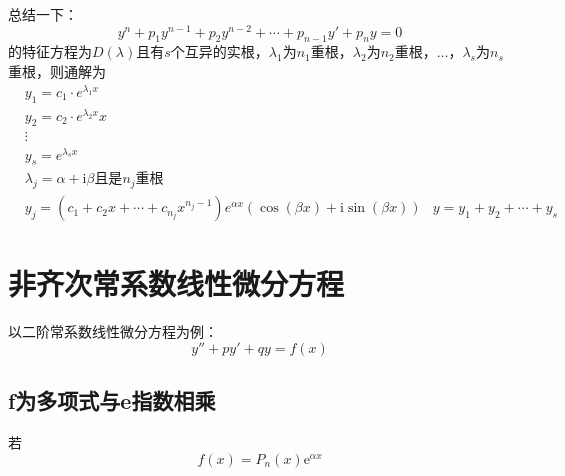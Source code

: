 \documentclass[math]{amznotes}
\begin{document}
总结一下：
\begin{equation*}
	y^n + p_1 y^{n-1} + p_2 y^{n-2} + \cdots + p_{n-1} y' + p_n y = 0
\end{equation*}
的特征方程为$D(\lambda)$且有$s$个互异的实根，$\lambda_1$为$n_1$重根，$\lambda_2$为$n_2$重根，$\ldots$，$\lambda_s$为$n_s$重根，则通解为
\begin{equation*}
	\begin{aligned}
		 & y_1 = c_1 \cdot e^{\lambda_1 x}                                                                           \\
		 & y_2 = c_2 \cdot e^{\lambda_2 x}x                                                                          \\
		 & \vdots                                                                                                    \\
		 & y_{s} = e^{\lambda_s x}                                                                                   \\
		 & \lambda_j = \alpha + \mathrm{i}\beta \text{且是}n_j\text{重根}                                                \\
		 & y_j = (c_1 + c_2 x + \cdots + c_{n_j} x^{n_j - 1}) e^{\alpha x}(\cos(\beta x) + \mathrm{i} \sin(\beta x))
		 & y = y_1 + y_2 + \cdots + y_s
	\end{aligned}
\end{equation*}
\section{非齐次常系数线性微分方程}
以二阶常系数线性微分方程为例：
\begin{equation*}
	y'' + py' + qy = f(x)
\end{equation*}
\subsection{f为多项式与e指数相乘}
若$$f(x) = P_n(x)\mathrm{e}^{\alpha x}$$
\end{document}
